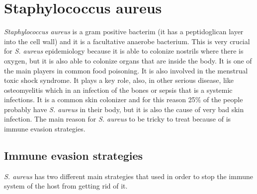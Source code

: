 \graphicspath{{chapters/images/09/}}

\chapter{Staphylococcus aureus}

\emph{Staphylococcus aureus} is a gram positive bacterim (it has a peptidoglican layer into the cell wall) and it is a facultative anaerobe bacterium. This is very crucial for \emph{S. aureus} epidemiology because it is able to colonize nostrils where there is oxygen, but it is also able to colonize organs that are inside the body. It is  one of the main players in common food poisoning. It is also involved in the menstrual toxic shock syndrome. It plays a key role, also, in other serious disease, like osteomyelitis which in an infection of the bones or sepsis that is a systemic infections. 
It is a common skin colonizer and for this reason 25$\%$ of the people probably have \emph{S. aureus} in their body, but it is also the cause of very bad skin infection. 
The main reason for \emph{S. aureus} to be tricky to treat because of is immune evasion strategies.

\section{Immune evasion strategies}

\emph{S. aureus} has two different main strategies that used in order to stop the immune system of the host from getting rid of it. 

